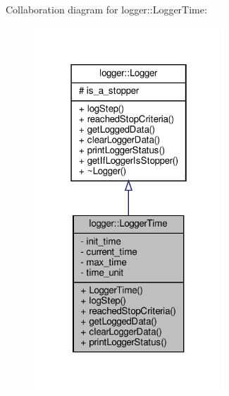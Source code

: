 Collaboration diagram for logger\+:\+:Logger\+Time\+:
\nopagebreak
\begin{figure}[H]
\begin{center}
\leavevmode
\includegraphics[width=202pt]{classlogger_1_1_logger_time__coll__graph}
\end{center}
\end{figure}
